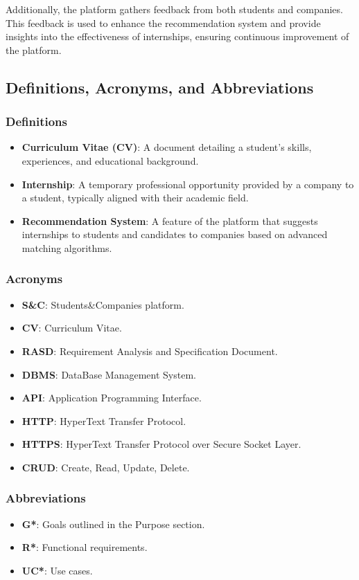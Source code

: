 \documentclass[12pt]{article}
\numberwithin{figure}{section}
\numberwithin{table}{section}
\begin{document}
\hspace{-0.8cm}
Additionally, the platform gathers feedback from both students and companies. This feedback is used to enhance the recommendation system and provide insights into the effectiveness of internships, ensuring continuous improvement of the platform.   

\subsection{Definitions, Acronyms, and Abbreviations}
\subsubsection{Definitions}
\begin{itemize}
    \item \textbf{Curriculum Vitae (CV)}: A document detailing a student's skills, experiences, and educational background.
    \item \textbf{Internship}: A temporary professional opportunity provided by a company to a student, typically aligned with their academic field.
    \item \textbf{Recommendation System}: A feature of the platform that suggests internships to students and candidates to companies based on advanced matching algorithms.
\end{itemize}

\subsubsection{Acronyms}
\begin{itemize}
    \item \textbf{S\&C}: Students\&Companies platform.
    \item \textbf{CV}: Curriculum Vitae.
    \item \textbf{RASD}: Requirement Analysis and Specification Document.
    \item \textbf{DBMS}: DataBase Management System.
    \item \textbf{API}: Application Programming Interface.
    \item \textbf{HTTP}: HyperText Transfer Protocol.
    \item \textbf{HTTPS}: HyperText Transfer Protocol over Secure Socket Layer.
    \item \textbf{CRUD}: Create, Read, Update, Delete.
\end{itemize}

\subsubsection{Abbreviations}
\begin{itemize}
    \item \textbf{G*}: Goals outlined in the Purpose section.
    \item \textbf{R*}: Functional requirements.
    \item \textbf{UC*}: Use cases.
\end{itemize}
\end{document}
